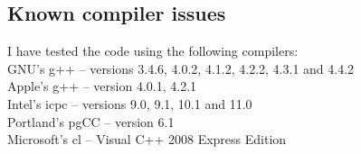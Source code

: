 \documentclass[twoside,letterpaper,11pt]{article}
\begin{document}
\subsection{Known compiler issues}
\label{Install_Issues}















I have tested the code using the following compilers:\\
$\quad$\\
GNU's g++ -- versions 3.4.6, 4.0.2, 4.1.2, 4.2.2, 4.3.1 and 4.4.2\\
Apple's g++ -- version 4.0.1, 4.2.1 \\
Intel's icpc -- versions 9.0, 9.1, 10.1 and 11.0\\
Portland's pgCC -- version 6.1\\
Microsoft's cl -- Visual C++ 2008 Express Edition\\
\end{document}
